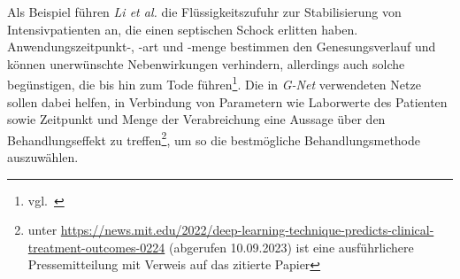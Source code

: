 Als Beispiel führen \textit{Li et al.} die Flüssigkeitszufuhr zur Stabilisierung von Intensivpatienten an, die einen septischen Schock erlitten haben. Anwendungszeitpunkt-, -art und -menge bestimmen den Genesungsverlauf und können unerwünschte Nebenwirkungen verhindern, allerdings auch solche begünstigen, die bis hin zum Tode führen\footnote{vgl.~\cite[5 f.]{SST+20}}. Die in \textit{G-Net} verwendeten Netze sollen dabei helfen, in Verbindung von Parametern wie Laborwerte des Patienten sowie Zeitpunkt und Menge der Verabreichung eine Aussage über den Behandlungseffekt zu treffen\footnote{
    unter \url{https://news.mit.edu/2022/deep-learning-technique-predicts-clinical-treatment-outcomes-0224} (abgerufen 10.09.2023) ist eine ausführlichere Pressemitteilung mit Verweis auf das zitierte Papier
}, um so die bestmögliche Behandlungsmethode auszuwählen.
